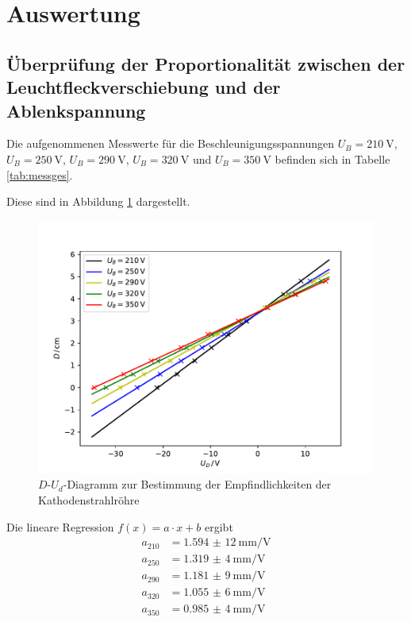 \section{Auswertung}

\subsection{Überprüfung der Proportionalität zwischen der Leuchtfleckverschiebung und der Ablenkspannung \label{sec:empf}}

Die aufgenommenen Messwerte für die Beschleunigungsspannungen $U_B = \SI{210}{\V}$, $U_B = \SI{250}{\V}$, $U_B = \SI{290}{\V}$,
$U_B = \SI{320}{\V}$ und $U_B = \SI{350}{\V}$ befinden sich in Tabelle \ref{tab:messges}.


\newpage
Diese sind in Abbildung \ref{fig:empf} dargestellt.
\begin{figure}[H]
  \centering
  \includegraphics[width=\textwidth]{Plots/empf.pdf}
  \caption{$D$-$U_d$-Diagramm zur Bestimmung der Empfindlichkeiten der Kathodenstrahlröhre}
  \label{fig:empf}
\end{figure}

Die lineare Regression $f(x) = a \cdot x + b$ ergibt
\begin{align*}
  a_{210} &= \SI{1,594(12)}{\milli \meter \per \volt}\\
  a_{250} &= \SI{1,319(4)}{\milli \meter \per \volt}\\
  a_{290} &= \SI{1,181(9)}{\milli \meter \per \volt}\\
  a_{320} &= \SI{1,055(6)}{\milli \meter \per \volt}\\
  a_{350} &= \SI{0,985(4)}{\milli \meter \per \volt}\\
\end{align*}

